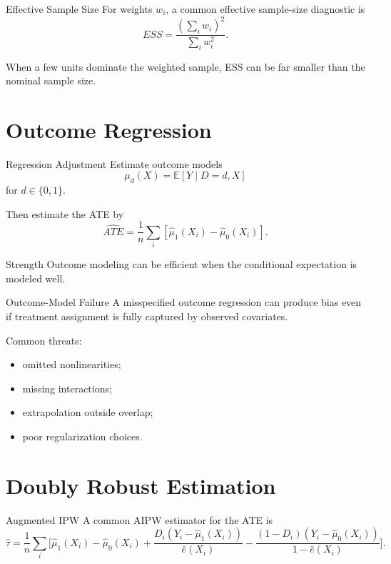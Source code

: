 \documentclass[aspectratio=169,11pt]{beamer}
\newcommand{\E}{\mathbb{E}}
\begin{document}
\begin{frame}{Effective Sample Size}
For weights \(w_i\), a common effective sample-size diagnostic is
\[
ESS=
\frac{(\sum_i w_i)^2}{\sum_i w_i^2}.
\]

When a few units dominate the weighted sample, ESS can be far smaller than the nominal sample size.
\end{frame}

\section{Outcome Regression}

\begin{frame}{Regression Adjustment}
Estimate outcome models
\[
\mu_d(X)=\E[Y\mid D=d,X]
\]
for \(d\in\{0,1\}\).

Then estimate the ATE by
\[
\widehat{ATE}
=
\frac{1}{n}
\sum_i
\left[
\widehat\mu_1(X_i)
-
\widehat\mu_0(X_i)
\right].
\]

\begin{block}{Strength}
Outcome modeling can be efficient when the conditional expectation is modeled well.
\end{block}
\end{frame}

\begin{frame}{Outcome-Model Failure}
A misspecified outcome regression can produce bias even if treatment assignment is fully captured by observed covariates.

Common threats:
\begin{itemize}
\item omitted nonlinearities;
\item missing interactions;
\item extrapolation outside overlap;
\item poor regularization choices.
\end{itemize}
\end{frame}

\section{Doubly Robust Estimation}

\begin{frame}{Augmented IPW}
A common AIPW estimator for the ATE is
\[
\widehat\tau
=
\frac{1}{n}
\sum_i
\Bigg[
\widehat\mu_1(X_i)
-
\widehat\mu_0(X_i)
+
\frac{D_i(Y_i-\widehat\mu_1(X_i))}{\widehat e(X_i)}
-
\frac{(1-D_i)(Y_i-\widehat\mu_0(X_i))}{1-\widehat e(X_i)}
\Bigg].
\]
\end{frame}
\end{document}
